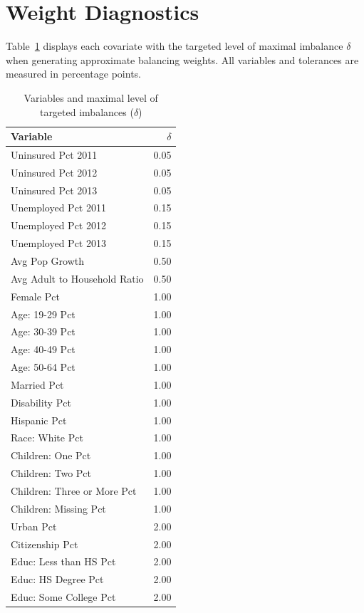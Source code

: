 \section{Weight Diagnostics}\label{ssec:balancetables}

Table~\ref{tab:toltable} displays each covariate with the targeted level of maximal imbalance $\delta$ when generating approximate balancing weights. All variables and tolerances are measured in percentage points.

\begin{table}[ht]
\centering
\caption{Variables and maximal level of targeted imbalances ($\delta$)}
\begin{tabular}{lr}\label{tab:toltable}
Variable & $\delta$ \\ 
  \hline
Uninsured Pct 2011 & 0.05 \\ 
  Uninsured Pct 2012 & 0.05 \\ 
  Uninsured Pct 2013 & 0.05 \\ 
  Unemployed Pct 2011 & 0.15 \\ 
  Unemployed Pct 2012 & 0.15 \\ 
  Unemployed Pct 2013 & 0.15 \\ 
  Avg Pop Growth & 0.50 \\ 
  Avg Adult to Household Ratio & 0.50 \\ 
  Female Pct & 1.00 \\ 
  Age: 19-29 Pct & 1.00 \\ 
  Age: 30-39 Pct & 1.00 \\ 
  Age: 40-49 Pct & 1.00 \\ 
  Age: 50-64 Pct & 1.00 \\ 
  Married Pct & 1.00 \\ 
  Disability Pct & 1.00 \\ 
  Hispanic Pct & 1.00 \\ 
  Race: White Pct & 1.00 \\ 
  Children: One Pct & 1.00 \\ 
  Children: Two Pct & 1.00 \\ 
  Children: Three or More Pct & 1.00 \\ 
  Children: Missing Pct & 1.00 \\ 
  Urban Pct & 2.00 \\ 
  Citizenship Pct & 2.00 \\ 
  Educ: Less than HS Pct & 2.00 \\ 
  Educ: HS Degree Pct & 2.00 \\ 
  Educ: Some College Pct & 2.00 \\ 

\end{tabular}
\end{table}
